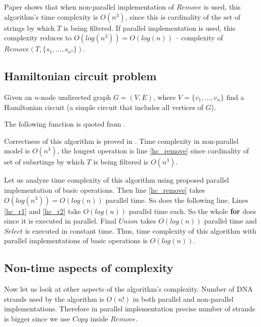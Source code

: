 Paper \cite{Katsanyi:2003} shows that when non-parallel implementation of $Remove$ is used, this algorithm's time complexity is $O(n^3)$, since this is cardinality of the set of strings by which $T$ is being filtered. If parallel implementation is used, this complexity reduces to $O(log(n^3))=O(log(n))$ -- complexity of $Remove(T, \{s_1, \dots, s_{n^3}\})$.

\subsection{Hamiltonian circuit problem}

Given an $n$-node undirected graph $G = (V, E)$, where $V=\{v_1, \dots, v_n\}$ find a Hamiltonian circuit (a simple circuit that includes all vertices of $G$).

The following function is quoted from \cite{Katsanyi:2003}.


Correctness of this algorithm is proved in \cite{Katsanyi:2003}. Time complexity in non-parallel model is $O(n^3)$, the longest operation is line \ref{hc_remove} since cardinality of set of subsrtings by which $T$ is being filtered is $O(n^3)$.

Let us analyze time complexity of this algorithm using proposed parallel implementation of basic operations. Then line \ref{hc_remove} takes $O(log(n^3))=O(log(n))$ parallel time. So does the following line. Lines \ref{hc_r1} and \ref{hc_r2} take $O(log(n))$ parallel time each. So the whole {\bf for} does since it is executed in parallel. Final $Union$ takes $O(log(n))$ parallel time and $Select$ is executed in constant time. Thus, time complexity of this algorithm with parallel implementations of basic operations is $O(log(n))$.

\subsection{Non-time aspects of complexity}
Now let us look at other aspects of the algorithm's complexity. Number of DNA strands used by the algorithm is $O(n!)$ in both parallel and non-parallel implementations. Therefore in parallel implementation precise number of strands is bigger since we use $Copy$ inside $Remove$.

